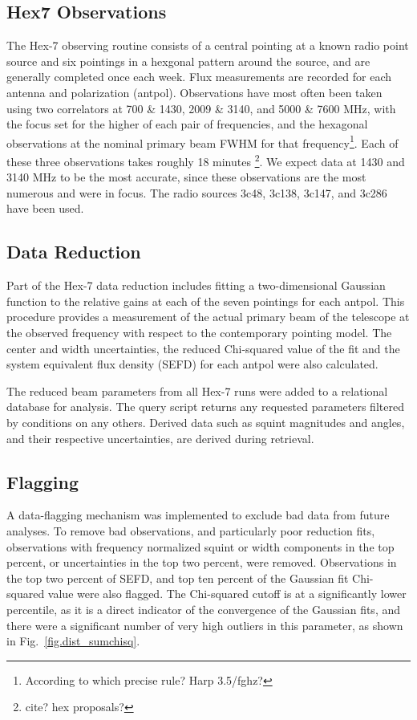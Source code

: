 \documentclass[preprint]{aastex}
\begin{document}
\subsection{Hex7 Observations}\label{ss.observations}
The Hex-7 observing routine consists of a central pointing at a known
radio point source and six pointings in a hexgonal pattern around the source, and are generally completed once 
each week.  Flux
measurements are recorded for each antenna and polarization
(antpol). Observations have most often been taken using two
correlators at 700 \& 1430, 2009 \& 3140, and 5000 \& 7600 MHz, with
the focus set for the higher of each pair of frequencies, and the hexagonal observations at the nominal primary beam FWHM for that frequency\footnote{According to which precise rule?  Harp 3.5/fghz?}.  Each of
these three observations takes roughly 18 minutes \footnote{cite? hex proposals?}. We expect data at 1430 and 3140 MHz to be the most
accurate, since these observations are the most numerous and were in
focus. The radio sources 3c48, 3c138, 3c147, and 3c286 have been
used.

\subsection{Data Reduction}\label{ss.reduction}
Part of the Hex-7 data reduction includes fitting a two-dimensional
Gaussian function to the relative gains at each of the seven pointings
for each antpol.  This procedure provides a measurement
of the actual primary beam of the telescope at the observed frequency with respect to the
contemporary pointing model.  The center and width uncertainties, the
reduced Chi-squared value of the fit and the system equivalent flux
density (SEFD) for each antpol were also calculated.

The reduced beam parameters from all Hex-7 runs were added to a relational database for analysis.  The query script returns any requested parameters filtered by conditions on any others.  Derived data such as squint magnitudes and angles, and their respective uncertainties, are derived during retrieval.

\subsection{Flagging}\label{ss.flagging}
A data-flagging mechanism was implemented to exclude bad data from future analyses.  To remove bad observations, and particularly poor reduction fits, observations with frequency normalized squint or width components in the top percent, or uncertainties in the top two percent, were removed.  Observations in the top two percent of SEFD, and top ten percent of the Gaussian fit Chi-squared value were also flagged.  The Chi-squared cutoff is at a significantly lower percentile, as it is a direct indicator of the convergence of the Gaussian fits, and there were a significant number of very high outliers in this parameter, as shown in Fig.~\ref{fig.dist_sumchisq}.  
\end{document}
